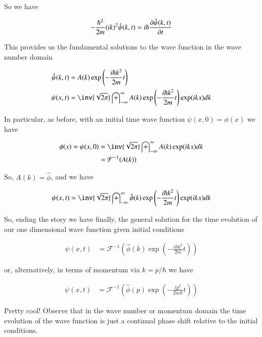 \documentclass{article}
\newcommand{\FF}[0]{\mathcal{F}}
\newcommand{\IIinf}[0]{ \int_{-\infty}^\infty }
\begin{document}
So we have

\begin{align*}
-\frac{\hbar^2}{2m} (ik)^2 \hat{\psi}(k,t) = i \hbar \PD{t}{\hat{\psi}(k,t)}
\end{align*}

This provides us the fundamental solutions to the wave function in the wave
number domain

\begin{align*}
\hat{\psi}(k,t) &= A(k) \exp\left( -\frac{i \hbar k^2}{ 2 m } t \right) \\
{\psi}(x,t) &= 
\inv{\sqrt{2\pi}} \IIinf A(k) \exp\left( -\frac{i \hbar k^2}{ 2 m } t \right) 
\exp( i k x ) dk \\
\end{align*}

In particular, as before, with an initial time wave function $\psi(x,0) = \phi(x)$ we have

\begin{align*}
\phi(x) = {\psi}(x,0)
&= \inv{\sqrt{2\pi}} \IIinf A(k) \exp( i k x ) dk \\
&= \FF^{-1}(A(k))
\end{align*}

So, $A(k) = \hat{\phi}$, and we have

\begin{align*}
{\psi}(x,t) &= 
\inv{\sqrt{2\pi}} \IIinf \hat{\phi}(k) \exp\left( -\frac{i \hbar k^2}{ 2 m } t \right) \exp( i k x ) dk \\
\end{align*}

So, ending the story we have finally, the general solution for the time evolution of our one dimensional wave function given
initial conditions

\begin{align}
{\psi}(x,t) &= \FF^{-1}\left( \hat{\phi}(k) \exp\left( -\frac{i \hbar k^2}{ 2 m } t \right) \right)
\end{align}

or, alternatively, in terms of momentum via $k = p/\hbar$ we have

\begin{align}
{\psi}(x,t) &= \FF^{-1}\left( \hat{\phi}(p) \exp\left( -\frac{i p^2}{ 2 m \hbar } t \right) \right)
\end{align}

Pretty cool!  Observe that in the wave number or momentum domain the time evolution of the wave function is just a continual phase shift relative to the initial conditions.
\end{document}
